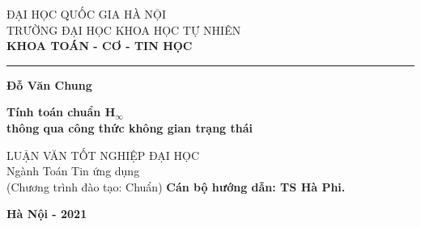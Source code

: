 \documentclass[12pt,a4paper]{article}
\begin{document}
\begin{titlepage}


\begin{center}
	{\fontsize{14pt}{15.6}\selectfont
		ĐẠI HỌC QUỐC GIA HÀ NỘI \\
		TRƯỜNG ĐẠI HỌC KHOA HỌC TỰ NHIÊN\\}
	\medspace
	{\fontsize{13pt}{15.6}\selectfont
		\textbf{KHOA TOÁN - CƠ - TIN HỌC}}
	
	\rule{7.25cm}{1pt}
	
	\vfill
	{\fontsize{14}{15.6}\selectfont \textbf{Đỗ Văn Chung}}
	\vfill
	
	{\fontsize{18}{20}\selectfont \textbf{Tính toán chuẩn H$_\infty$ \\ thông qua công thức không gian trạng thái}}
	\vfill
	
	{\fontsize{14}{15.6}\selectfont 
		LUẬN VĂN TỐT NGHIỆP ĐẠI HỌC\\
		\vspace{1cm}
		Ngành Toán Tin ứng dụng\\
		(Chương trình đào tạo: Chuẩn)
	}
	\vfill
	{\fontsize{14}{15.6}\selectfont \textbf{Cán bộ hướng dẫn: TS Hà Phi.}}
	
	\vfill
	{\fontsize{14}{15.6}\selectfont \textbf{Hà Nội - 2021}}
\end{center}
\end{titlepage}
\end{document}

